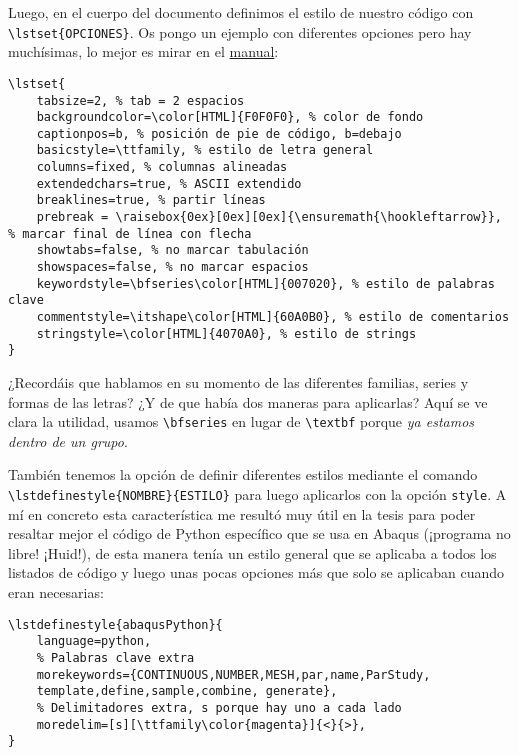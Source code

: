 Luego, en el cuerpo del documento definimos el estilo de nuestro código
con \lstinline!\lstset{OPCIONES}!. Os pongo un ejemplo con diferentes
opciones pero hay muchísimas, lo mejor es mirar en el
\href{http://osl.ugr.es/CTAN/macros/latex/contrib/listings/listings.pdf}{manual}:

\begin{lstlisting}[language={[latex]tex}]
\lstset{
    tabsize=2, % tab = 2 espacios
    backgroundcolor=\color[HTML]{F0F0F0}, % color de fondo
    captionpos=b, % posición de pie de código, b=debajo
    basicstyle=\ttfamily, % estilo de letra general
    columns=fixed, % columnas alineadas
    extendedchars=true, % ASCII extendido
    breaklines=true, % partir líneas
    prebreak = \raisebox{0ex}[0ex][0ex]{\ensuremath{\hookleftarrow}}, % marcar final de línea con flecha
    showtabs=false, % no marcar tabulación
    showspaces=false, % no marcar espacios
    keywordstyle=\bfseries\color[HTML]{007020}, % estilo de palabras clave
    commentstyle=\itshape\color[HTML]{60A0B0}, % estilo de comentarios
    stringstyle=\color[HTML]{4070A0}, % estilo de strings
}
\end{lstlisting}

¿Recordáis que hablamos en su momento de las diferentes familias, series
y formas de las letras? ¿Y de que había dos maneras para aplicarlas?
Aquí se ve clara la utilidad, usamos \lstinline!\bfseries! en lugar de
\lstinline!\textbf! porque \emph{ya estamos dentro de un grupo}.

También tenemos la opción de definir diferentes estilos mediante el
comando \lstinline!\lstdefinestyle{NOMBRE}{ESTILO}! para luego
aplicarlos con la opción \lstinline!style!. A mí en concreto esta
característica me resultó muy útil en la tesis para poder resaltar mejor
el código de Python específico que se usa en Abaqus (¡programa no libre!
¡Huid!), de esta manera tenía un estilo general que se aplicaba a todos
los listados de código y luego unas pocas opciones más que solo se
aplicaban cuando eran necesarias:

\begin{lstlisting}[language={[latex]tex}]
\lstdefinestyle{abaqusPython}{
    language=python,
    % Palabras clave extra
    morekeywords={CONTINUOUS,NUMBER,MESH,par,name,ParStudy,
    template,define,sample,combine, generate},
    % Delimitadores extra, s porque hay uno a cada lado
    moredelim=[s][\ttfamily\color{magenta}]{<}{>},
}


\end{lstlisting}

